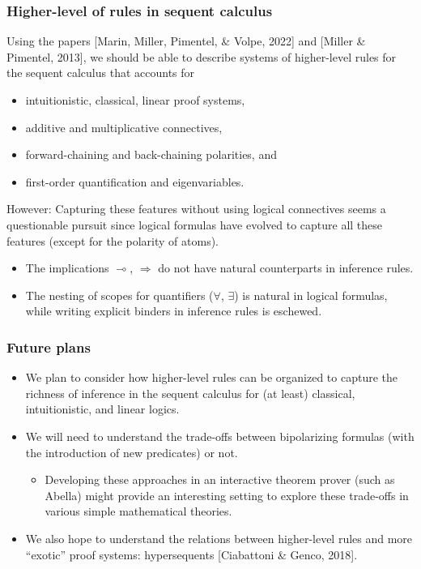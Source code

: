 \documentclass[9pt]{beamer}
\begin{document}
\begin{frame}
\frametitle{Higher-level of rules in sequent calculus}

Using the papers [Marin, Miller, Pimentel, \& Volpe, 2022] and [Miller
  \& Pimentel, 2013], we should be able to describe systems of
higher-level rules for the sequent calculus that accounts for
\begin{itemize}
\item intuitionistic, classical, linear proof systems,
\item additive and multiplicative connectives,
\item forward-chaining and back-chaining polarities, and 
\item first-order quantification and eigenvariables.
\end{itemize}
\vfill
\pause

However: Capturing these features without using logical connectives
seems a questionable pursuit since logical formulas have evolved to
capture all these features (except for the polarity of atoms).
\vfill

\begin{itemize}
\item The implications $\multimap$, $\Rightarrow$ do not 
  have natural counterparts in inference rules.
  
\item The nesting of scopes for quantifiers ($\forall$, $\exists$) is
  natural in logical formulas, while writing explicit binders in
  inference rules is eschewed.
\end{itemize}
\vfill

\end{frame}

\begin{frame}
\frametitle{Future plans}

\begin{itemize}

\item We plan to consider how higher-level rules can be organized to
  capture the richness of inference in the sequent calculus for (at
  least) classical, intuitionistic, and linear logics.

\vfill

\item We will need to understand the trade-offs between bipolarizing
  formulas (with the introduction of new predicates) or not.
  \medskip
  
\begin{itemize}
  \item Developing these approaches in an interactive theorem
    prover (such as Abella) might provide an interesting setting to
    explore these trade-offs in various simple mathematical theories.
\end{itemize}
\vfill

\item We also hope to understand the relations between higher-level
  rules and more “exotic” proof systems: hypersequents [Ciabattoni \&
    Genco, 2018]. 
\vfill
\vfill
\end{itemize}
\end{frame}
\end{document}
